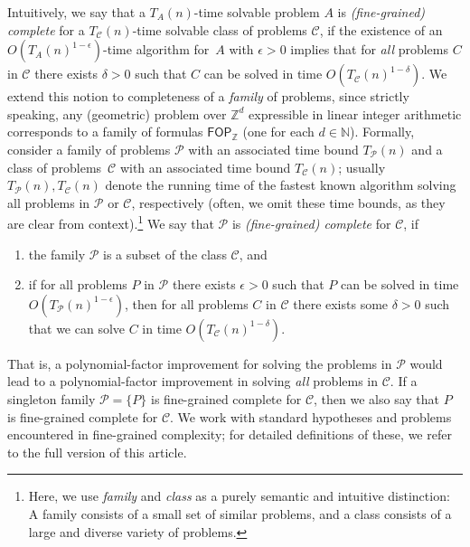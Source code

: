 Intuitively, we say that a $T_A(n)$-time solvable problem $A$ is \emph{(fine-grained) complete} for a $T_{\mathcal{C}}(n)$-time solvable class of problems $\mathcal{C}$, if the existence of an $O(T_A(n)^{1-\epsilon})$-time algorithm for~$A$ with $\epsilon>0$ implies that for \emph{all} problems $C$ in $\mathcal{C}$ there exists $\delta > 0$ such that $C$ can be solved in time $O(T_{\mathcal{C}}(n)^{1-\delta})$. We extend this notion to completeness of a \emph{family} of problems, since strictly speaking, any (geometric) problem over $\mathbb{Z}^d$ expressible in linear integer arithmetic corresponds to a family of formulas $\mathsf{FOP}_{\mathbb{Z}}$ (one for each $d\in \mathbb{N}$).
Formally, consider a family of problems $\mathcal{P}$ with an associated time bound $T_{\mathcal{P}}(n)$ and a class of problems~$\mathcal{C}$ with an associated time bound $T_{\mathcal{C}}(n)$; usually $T_{\mathcal{P}}(n), T_{\mathcal{C}}(n)$ denote the running time of the fastest known algorithm solving all problems in $\mathcal{P}$ or $\mathcal{C}$, respectively (often, we omit these time bounds, as they are clear from context).\footnote{Here, we use \emph{family} and \emph{class} as a purely semantic and intuitive distinction: A family consists of a small set of similar problems, and a class consists of a large and diverse variety of problems.}
We say that $\mathcal{P}$ is \emph{(fine-grained) complete} for $\mathcal{C}$, if
\begin{enumerate}
\item the family $\mathcal{P}$ is a subset of the class $\mathcal{C}$, and
\item if for all problems $P$ in $\mathcal{P}$ there exists $\epsilon>0$ such that $P$ can be solved in time $O(T_{\mathcal{P}}(n)^{1-\epsilon})$, then for all problems $C$ in $\mathcal{C}$ there exists some $\delta>0$ such that we can solve $C$ in time $O(T_{\mathcal{C}}(n)^{1-\delta})$.
\end{enumerate}
That is, a polynomial-factor improvement for solving the problems in $\mathcal{P}$ would lead
to a polynomial-factor improvement in solving \emph{all} problems in $\mathcal{C}$.
If a singleton family $\mathcal{P} = \{P\}$ is fine-grained complete for $\mathcal{C}$, then we also say that $P$ is fine-grained complete for $\mathcal{C}$.
We work with standard hypotheses and problems encountered in fine-grained complexity; for detailed definitions of these, we refer to the full version of this article.

